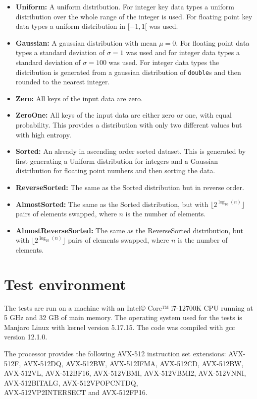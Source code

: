 \documentclass[12pt, a4paper, openright, twoside]{tiarbeit}
\begin{document}
\begin{itemize}
  \item \textbf{Uniform:} A uniform distribution. For integer key data types
        a uniform distribution over the whole range of the integer is used.
        For floating point key data types a uniform distribution in $[-1,1[$ was used.
  \item \textbf{Gaussian:} A gaussian distribution with
        mean $\mu=0$. For floating point data types a standard deviation of $\sigma=1$
        was used and for integer data types a standard deviation of $\sigma=100$
        was used. For integer data types the distribution is generated from a
        gaussian distribution of \texttt{double}s and then rounded to the
        nearest integer.
  \item \textbf{Zero:} All keys of the input data are zero.
  \item \textbf{ZeroOne:} All keys of the input data are either zero or one,
        with equal probability. This provides a distribution with only two different
        values but with high entropy.
  \item \textbf{Sorted:} An already in ascending order sorted dataset. This
        is generated by first generating a Uniform distribution for integers and
        a Gaussian distribution for floating point numbers and then sorting the data.
  \item \textbf{ReverseSorted:} The same as the Sorted distribution but in reverse order.
  \item \textbf{AlmostSorted:} The same as the Sorted distribution, but with
        $\lfloor2^{\log_{10}(n)}\rfloor$ pairs of elements swapped, where $n$ is the number of elements.
  \item \textbf{AlmostReverseSorted:} The same as the ReverseSorted distribution, but with
        $\lfloor2^{\log_{10}(n)}\rfloor$ pairs of elements swapped, where $n$ is the number of elements.
\end{itemize}

\section{Test environment}
The tests are run on a machine with an Intel© Core™ i7-12700K CPU running at 5 GHz
and 32 GB of main memory. The operating system used for
the tests is Manjaro Linux with kernel version 5.17.15.
The code was compiled with gcc version 12.1.0.

The processor provides the following AVX-512 instruction
set extensions: \mbox{AVX-512F}, \mbox{AVX-512DQ}, \mbox{AVX-512BW}, \mbox{AVX-512IFMA}, \mbox{AVX-512CD}, \mbox{AVX-512BW},
\mbox{AVX-512VL}, \mbox{AVX-512BF16}, \mbox{AVX-512VBMI}, \mbox{AVX-512VBMI2}, \mbox{AVX-512VNNI}, \mbox{AVX-512BITALG},
\mbox{AVX-512VPOPCNTDQ},\\
\mbox{AVX-512VP2INTERSECT} and \mbox{AVX-512FP16}.
\end{document}
